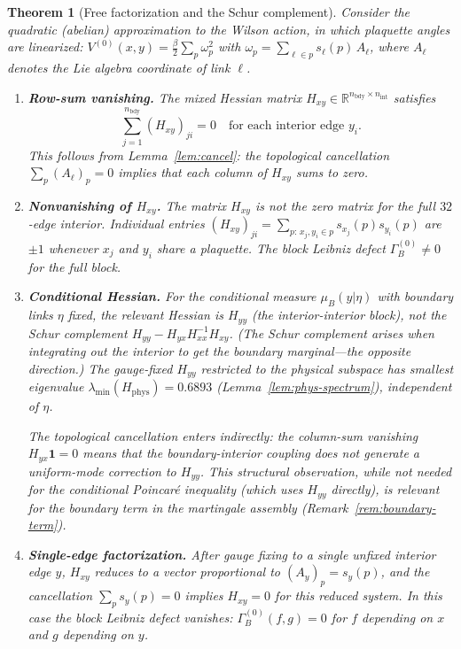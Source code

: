 \documentclass[11pt,a4paper]{article}
\theoremstyle{plain}
\newtheorem{theorem}{Theorem}[section]
\theoremstyle{definition}
\theoremstyle{remark}
\newcommand{\R}{\mathbb{R}}
\begin{document}
\begin{theorem}[Free factorization and the Schur complement]\label{thm:free-leibniz}
Consider the quadratic (abelian) approximation to the Wilson action,
in which plaquette angles are linearized:
$V^{(0)}(x,y) = \frac{\beta}{2}\sum_p \omega_p^2$
with $\omega_p = \sum_{\ell \in p} s_\ell(p)\,A_\ell$, where $A_\ell$
denotes the Lie algebra coordinate of link $\ell$.

\begin{enumerate}[label=(\alph*)]
\item \textbf{Row-sum vanishing.}
  The mixed Hessian matrix $H_{xy} \in \R^{n_{\mathrm{bdy}}
  \times n_{\mathrm{int}}}$ satisfies
  \begin{equation}
  \sum_{j=1}^{n_{\mathrm{bdy}}} (H_{xy})_{ji} = 0
  \quad\text{for each interior edge } y_i.
  \end{equation}
  This follows from Lemma~\ref{lem:cancel}: the topological
  cancellation $\sum_p (A_\ell)_p = 0$ implies that each column
  of $H_{xy}$ sums to zero.

\item \textbf{Nonvanishing of $H_{xy}$.}
  The matrix $H_{xy}$ is \emph{not} the zero matrix for the full
  $32$-edge interior. Individual entries
  $(H_{xy})_{ji} = \sum_{p:\,x_j, y_i \in p} s_{x_j}(p)s_{y_i}(p)$
  are $\pm 1$ whenever $x_j$ and $y_i$ share a plaquette. The block
  Leibniz defect $\Gamma_B^{(0)} \neq 0$ for the full block.

\item \textbf{Conditional Hessian.}
  For the conditional measure $\mu_B(y|\eta)$ with boundary links
  $\eta$ fixed, the relevant Hessian is $H_{yy}$ (the
  interior-interior block), \emph{not} the Schur complement
  $H_{yy} - H_{yx}H_{xx}^{-1}H_{xy}$. (The Schur complement arises
  when integrating out the interior to get the boundary marginal---the
  opposite direction.) The gauge-fixed $H_{yy}$ restricted to the
  physical subspace has smallest eigenvalue
  $\lambda_{\min}(H_{\mathrm{phys}}) = 0.6893$
  (Lemma~\ref{lem:phys-spectrum}), independent of $\eta$.

  The topological cancellation enters indirectly: the column-sum
  vanishing $H_{yx}\mathbf{1} = 0$ means that the boundary-interior
  coupling does not generate a uniform-mode correction to $H_{yy}$.
  This structural observation, while not needed for the conditional
  Poincar\'e inequality (which uses $H_{yy}$ directly), is relevant
  for the boundary term in the martingale assembly
  (Remark~\ref{rem:boundary-term}).

\item \textbf{Single-edge factorization.}
  After gauge fixing to a single unfixed interior edge $y$,
  $H_{xy}$ reduces to a vector proportional to
  $(A_y)_p = s_y(p)$, and the cancellation $\sum_p s_y(p) = 0$
  implies $H_{xy} = 0$ for this reduced system. In this case
  the block Leibniz defect vanishes:
  $\Gamma_B^{(0)}(f,g) = 0$ for $f$ depending on $x$ and $g$
  depending on $y$.
\end{enumerate}
\end{theorem}
\end{document}
